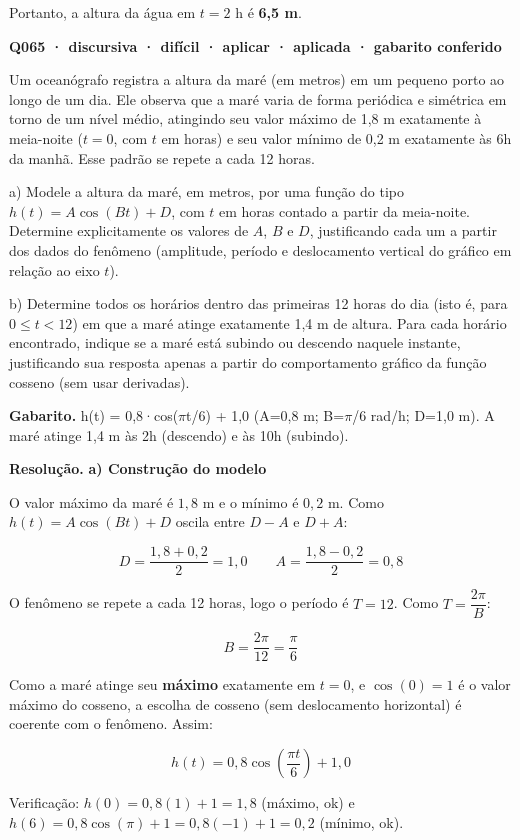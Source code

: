 \documentclass[11pt,a4paper]{article}
\begin{document}
Portanto, a altura da água em $t=2$ h é \textbf{6,5 m}.

\bigskip\noindent\textbf{Q065 · discursiva · difícil · aplicar · aplicada · gabarito conferido}\par\nopagebreak
Um oceanógrafo registra a altura da maré (em metros) em um pequeno porto ao longo de um dia. Ele observa que a maré varia de forma periódica e simétrica em torno de um nível médio, atingindo seu valor máximo de 1,8 m exatamente à meia-noite ($t=0$, com $t$ em horas) e seu valor mínimo de 0,2 m exatamente às 6h da manhã. Esse padrão se repete a cada 12 horas.

a) Modele a altura da maré, em metros, por uma função do tipo $h(t) = A\cos(Bt) + D$, com $t$ em horas contado a partir da meia-noite. Determine explicitamente os valores de $A$, $B$ e $D$, justificando cada um a partir dos dados do fenômeno (amplitude, período e deslocamento vertical do gráfico em relação ao eixo $t$).

b) Determine todos os horários dentro das primeiras 12 horas do dia (isto é, para $0 \le t < 12$) em que a maré atinge exatamente 1,4 m de altura. Para cada horário encontrado, indique se a maré está subindo ou descendo naquele instante, justificando sua resposta apenas a partir do comportamento gráfico da função cosseno (sem usar derivadas).

\textbf{Gabarito.} h(t) = 0,8·cos($\pi$t/6) + 1,0 (A=0,8 m; B=$\pi$/6 rad/h; D=1,0 m). A maré atinge 1,4 m às 2h (descendo) e às 10h (subindo).

\textbf{Resolução.} \textbf{a) Construção do modelo}

O valor máximo da maré é $1{,}8$ m e o mínimo é $0{,}2$ m. Como $h(t)=A\cos(Bt)+D$ oscila entre $D-A$ e $D+A$:

$$D = \frac{1{,}8+0{,}2}{2} = 1{,}0 \qquad A = \frac{1{,}8-0{,}2}{2} = 0{,}8$$

O fenômeno se repete a cada 12 horas, logo o período é $T=12$. Como $T=\dfrac{2\pi}{B}$:

$$B = \frac{2\pi}{12} = \frac{\pi}{6}$$

Como a maré atinge seu \textbf{máximo} exatamente em $t=0$, e $\cos(0)=1$ é o valor máximo do cosseno, a escolha de cosseno (sem deslocamento horizontal) é coerente com o fenômeno. Assim:

$$h(t) = 0{,}8\cos\!\left(\frac{\pi t}{6}\right) + 1{,}0$$

Verificação: $h(0)=0{,}8(1)+1=1{,}8$ (máximo, ok) e $h(6)=0{,}8\cos(\pi)+1=0{,}8(-1)+1=0{,}2$ (mínimo, ok).
\end{document}
